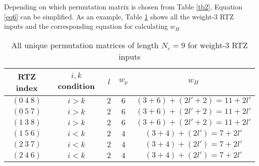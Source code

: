 \documentclass[11pt, oneside, dvipdfmx]{book}
\begin{document}
Depending on which permutation matrix is chosen from Table \ref{tb2}, Equation \ref{eq6} can be simplified. As an example, Table \ref{tb3} shows all the weight-$3$ RTZ inputs and the corresponding equation for calculating $w_H$
\begin{table}
\centering
\begin{tabular}{||c | c  |c  |c  |c |} 
 \hline
 RTZ index & $i,k$ condition &$ l$ & $w_p$& $w_H$\\
 \hline
 $(0~4~8)$ & $i>k$ & $2$ & $6$ & $(3+6)+(2l'+2) = 11+2l'$\\
 \hline
 $(0~5~7)$ & $i>k$ & $2$ & $6$ & $(3+6)+(2l'+2) = 11+2l'$\\
 \hline
 $(1~3~8)$ & $i>k$ & $2$ & $6$ & $(3+6)+(2l'+2) = 11+2l'$\\
 \hline
 $(1~5~6)$ & $i<k$ & $2$ & $4$ & $(3+4)+(2l') = 7+2l'$\\
 \hline
 $(2~3~7)$ & $i<k$ & $2$ & $4$ & $(3+4)+(2l') = 7+2l'$\\
 \hline
 $(2~4~6)$ & $i<k$ & $2$ & $4$ & $(3+4)+(2l') = 7+2l'$\\
 \hline
\end{tabular}
\caption{All unique permutation matrices of length $N_c =9$ for weight-$3$ RTZ inputs}
\label{tb3}
\end{table}


 
\end{document}
